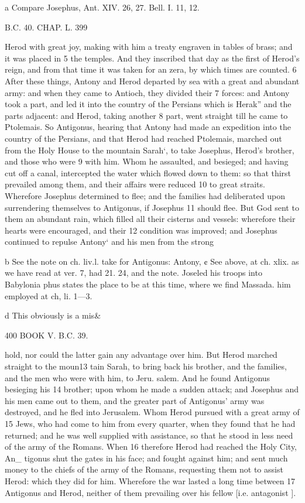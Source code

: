 a Compare Josephus, Ant. XIV. 26, 27. Bell. I. 11, 12. 

B.C. 40. CHAP. L. 399 

Herod with great joy, making with him a treaty engraven in tables of brass; and it was placed in 
5 the temples. And they inscribed that day as the first of Herod’s reign, and from that time it was taken for an zera, by which times are counted. 
6 After these things, Antony and Herod departed by sea with a great and abundant army: and when they came to Antioch, they divided their 
7 forces: and Antony took a part, and led it into the country of the Persians which is Herak” and the parts adjacent: and Herod, taking another 
8 part, went straight till he came to Ptolemais. So Antigonus, hearing that Antony had made an expedition into the country of the Persians, and that Herod had reached Ptolemais, marched out from the Holy House to the mountain Sarah‘, to take Josephus, Herod’s brother, and those who were 
9 with him. Whom he assaulted, and besieged; and having cut off a canal, intercepted the water which flowed down to them: so that thirst prevailed among them, and their affairs were reduced 
10 to great straits. Wherefore Josephus determined to flee; and the families had deliberated upon surrendering themselves to Antigonus, if Josephus 
11 should flee. But God sent to them an abundant rain, which filled all their cisterns and vessels: wherefore their hearts were encouraged, and their 
12 condition was improved; and Josephus continued to repulse Antony‘ and his men from the strong 

b See the note on ch. liv.l. take for Antigonus: Antony, ¢ See above, at ch. xlix. as we have read at ver. 7, had 21. 24, and the note. Joseled his troops into Babylonia phus states the place to be at this time, where we find Massada. him employed at ch, li. 1—3. 

d This obviously is a mis& 

400 BOOK V. B.C. 39. 

hold, nor could the latter gain any advantage over him. But Herod marched straight to the moun13 tain Sarah, to bring back his brother, and the families, and the men who were with him, to Jeru. salem. And he found Antigonus besieging his 14 brother; upon whom he made a sudden attack; and Josephus and his men came out to them, and the greater part of Antigonus’ army was destroyed, and he fled into Jerusalem. 
Whom Herod pursued with a great army of 15 Jews, who had come to him from every quarter, when they found that he had returned; and he was well supplied with assistance, so that he stood in less need of the army of the Romans. When 16 therefore Herod had reached the Holy City, An_ tigonus shut the gates in his face; and fought against him; and sent much money to the chiefs of the army of the Romans, requesting them not to assist Herod: which they did for him. Wherefore the war lasted a long time between 17 Antigonus and Herod, neither of them prevailing over his fellow [i.e. antagonist ]. 

